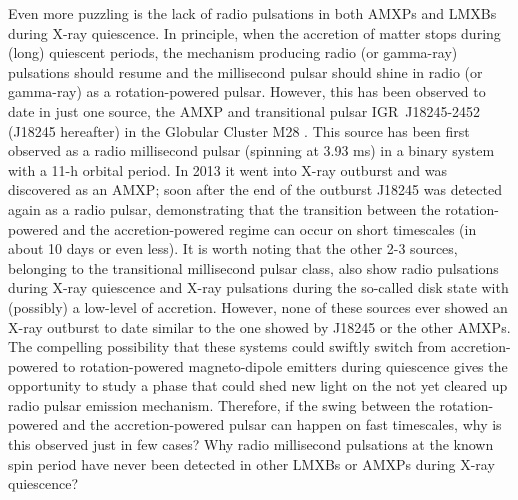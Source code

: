 \documentclass[graybox]{svmult}
\begin{document}
Even more puzzling is the lack of radio pulsations in both AMXPs and LMXBs during X-ray quiescence. In principle, when the accretion of matter stops during (long) quiescent periods, the mechanism producing radio (or gamma-ray) pulsations should resume and the millisecond pulsar should shine in radio (or gamma-ray) as a rotation-powered pulsar. However, this has been observed to date in just one source, the AMXP and transitional pulsar IGR~J18245-2452 (J18245 hereafter) in the Globular Cluster M28 \cite{Papitto2013b}. This source has been first observed as a radio millisecond pulsar (spinning at 3.93 ms) in a binary system with a 11-h orbital period. In 2013 it went into X-ray outburst and was discovered as an AMXP; soon after the end of the outburst J18245 was detected again as a radio pulsar, demonstrating that the transition between the rotation-powered and the accretion-powered regime can occur on short timescales (in about 10 days or even less). It is worth noting that the other 2-3 sources, belonging to the transitional millisecond pulsar class, also show radio pulsations during X-ray quiescence and X-ray pulsations during the so-called disk state with (possibly) a low-level of accretion. However, none of these sources ever showed an X-ray outburst to date similar to the one showed by J18245 or the other AMXPs. The compelling possibility that these systems could swiftly switch from accretion-powered to rotation-powered magneto-dipole emitters during quiescence gives the opportunity to study a phase that could shed new light on the not yet cleared up radio pulsar emission mechanism. Therefore, if the swing between the rotation-powered and the accretion-powered pulsar can happen on fast timescales, why is this  observed just in few cases? Why radio millisecond pulsations at the known spin period have never been detected in other LMXBs or AMXPs during X-ray quiescence? 
\end{document}

